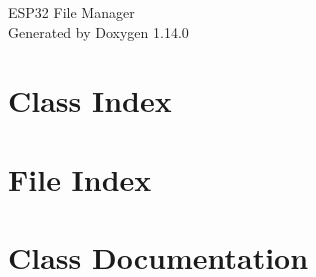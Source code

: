 \documentclass[twoside]{book}
\newcommand{\+}{\discretionary{\mbox{\scriptsize$\hookleftarrow$}}{}{}}
\newcommand{\clearemptydoublepage}{%
    \newpage{\pagestyle{empty}\cleardoublepage}%
  }
\begin{document}
  \raggedbottom
    \hypersetup{pageanchor=false,
                bookmarksnumbered=true,
                pdfencoding=unicode
               }
  \begin{titlepage}
  \vspace*{7cm}
  \begin{center}%
  {\Large ESP32 File Manager}\\
  \vspace*{1cm}
  {\large Generated by Doxygen 1.14.0}\\
  \end{center}
  \end{titlepage}
  \clearemptydoublepage
  \tableofcontents
  \clearemptydoublepage
  \hypersetup{pageanchor=true}
\chapter{Class Index}

\chapter{File Index}

\chapter{Class Documentation}





























\end{document}
